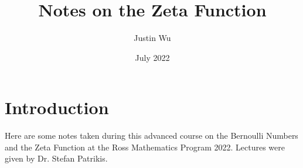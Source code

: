 \documentclass{scrartcl}
\title{Notes on the Zeta Function}
\author{Justin Wu}
\date{July 2022}
\begin{document}
\maketitle
\section{Introduction}
Here are some notes taken during this advanced course on the Bernoulli Numbers and the Zeta Function 
at the Ross Mathematics Program 2022. Lectures were given by Dr. Stefan Patrikis.
\tableofcontents 
\newpage

% 






\end{document}
